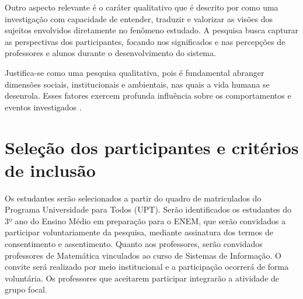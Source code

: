 %
%
%


Outro aspecto relevante é o caráter qualitativo que é descrito por \cite{yin2016pesquisa} como uma
investigação com capacidade de entender, traduzir e valorizar as visões dos
sujeitos envolvidos diretamente no fenômeno estudado. A pesquisa busca capturar as perspectivas dos participantes, focando nos
significados e nas percepções de professores e alunos durante o desenvolvimento 
do sistema. 

Justifica-se como uma pesquisa qualitativa, pois é fundamental abranger dimensões sociais, 
institucionais e ambientais, nas quais a vida humana se desenrola. Esses fatores exercem profunda influência sobre os
comportamentos e eventos investigados \cite{yin2016pesquisa}.

\section{Seleção dos participantes e critérios de inclusão}
\label{sec:selecao-participantes}
Os estudantes serão selecionados a partir do quadro de matriculados do Programa
Universidade para Todos (UPT). Serão identificados os estudantes do 3º ano do
Ensino Médio em preparação para o ENEM, que serão convidados a participar
voluntariamente da pesquisa, mediante assinatura dos termos de consentimento e
assentimento. Quanto aos professores, serão convidados professores de Matemática
vinculados ao curso de Sistemas de Informação. O convite será realizado por
meio institucional e a participação ocorrerá de forma voluntária. Os professores
que aceitarem participar integrarão a atividade de grupo focal.


